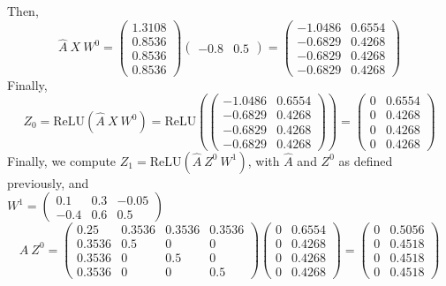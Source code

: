 \documentclass[a4paper]{article}
\begin{document}
Then, 
\[
\hat{A}\ X\ W^0 = \begin{pmatrix} 1.3108\\0.8536\\0.8536\\0.8536 \end{pmatrix} \begin{pmatrix}
        -0.8 & 0.5
    \end{pmatrix} =  \begin{pmatrix}
        -1.0486 & 0.6554 \\ -0.6829 & 0.4268 \\ -0.6829 & 0.4268 \\ -0.6829 & 0.4268
    \end{pmatrix} 
\]
Finally,
\[
Z_0 = \text{ReLU} (\hat{A}\ X\ W^0) = \text{ReLU} (\begin{pmatrix}
        -1.0486 & 0.6554 \\ -0.6829 & 0.4268 \\ -0.6829 & 0.4268 \\ -0.6829 & 0.4268
    \end{pmatrix} ) = \begin{pmatrix}
        0 & 0.6554 \\ 0 & 0.4268 \\ 0 & 0.4268 \\ 0 & 0.4268
    \end{pmatrix} 
\]
Finally, we compute $Z_1 = \text{ReLU} (\hat{A}\ Z^0\ W^1)$, with $\hat{A}$ and $Z^0$ as defined previously, and\\ $W^1 = \begin{pmatrix}
        0.1 & 0.3 & -0.05 \\ -0.4 & 0.6 & 0.5
    \end{pmatrix}$
\[
\hat{A}\ Z^0 = \begin{pmatrix}
0.25 & 0.3536 & 0.3536 & 0.3536 \\
0.3536 & 0.5 & 0 & 0 \\
0.3536 & 0 & 0.5 & 0 \\
0.3536 & 0 & 0 & 0.5
\end{pmatrix} \begin{pmatrix}
        0 & 0.6554 \\ 0 & 0.4268 \\ 0 & 0.4268 \\ 0 & 0.4268
    \end{pmatrix} = \begin{pmatrix}
        0 & 0.5056 \\ 0 & 0.4518 \\ 0 & 0.4518 \\ 0 & 0.4518
    \end{pmatrix}
\]
\end{document}
